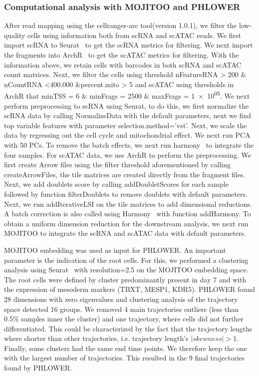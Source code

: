 \subsubsection{Computational analysis with MOJITOO and PHLOWER}
After read mapping using the cellranger-arc tool(version 1.0.1), we filter the low-quality cells using information both from scRNA and scATAC reads. We first import scRNA to Seurat~\citep{stuart2019seurat3} to get the scRNA metrics for filtering. We next import the fragments into ArchR~\citep{granja2021archr} to get the scATAC metrics for filtering. With the information above, we retain cells with barcodes in both scRNA and scATAC count matrices. Next, we filter the cells using threshold nFeatureRNA > \num{200} \& nCountRNA <\num{400,000} \&percent.mito > 5 and scATAC using thresholds in ArchR that minTSS = \num{6} \& minFrags = \num{2500} \& maxFrags = \num{1e+05}. We next perform preprocessing to scRNA using Seurat, to do this, we first normalize the scRNA data by calling NormalizeData with the default parameters, next we find top variable features with parameter selection.method='vst'. Next, we scale the data by regressing out the cell cycle and mitochondrial effect. We next run PCA with 50 PCs. To remove the batch effects, we next run harmony~\citep{korsunsky2019harmony} to integrate the four samples. For scATAC data, we use ArchR to perform the preprocessing. We first create Arrow files using the filter threshold aforementioned by calling createArrowFiles, the tile matrices are created directly from the fragment files. Next, we add doublets score by calling addDoubletScores for each sample followed by function filterDoublets to remove doublets with default parameters. Next, we run addIterativeLSI on the tile matrices to add dimensional reductions. A batch correction is also called using Harmony~\citep{korsunsky2019harmony} with function addHarmony. To obtain a uniform dimension reduction for the downstream analysis, we next run MOJITOO to integrate the scRNA and scATAC data with default parameters. 

MOJITOO embedding was used as input for PHLOWER. An important parameter is the indication of the root cells. For this, we performed a clustering analysis using Seurat~\citep{stuart2019seurat3} with resolution=\num{2.5} on the MOJITOO embedding space. The root cells were defined by cluster predominantly present in day \num{7} and with the expression of mesoderm markers (TBXT, MESP1, KDR5). PHLOWER found \num{28} dimensions with zero eigenvalues and clustering analysis of the trajectory space detected 16 groups. We removed \num{4} main trajectories outliers (less than \num{0.5}\% samples inner the cluster) and one trajectory, where cells did not further differentiated. This could be characterized by the fact that the trajectory lengths where shorter than other trajectories, i.e. trajectory length's $|skewness| > 1$. 
Finally, some clusters had the same end time points. We therefore keep the one with the largest number of trajectories. This resulted in the \num{9} final trajectories found by PHLOWER.

